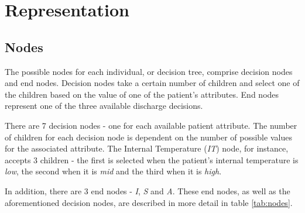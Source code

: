 \section{Representation}

\subsection{Nodes}
The possible nodes for each individual, or decision tree, comprise decision nodes and end nodes. Decision nodes take a certain number of children and select one of the children based on the value of one of the patient's attributes. End nodes represent one of the three available discharge decisions.

There are 7 decision nodes - one for each available patient attribute. The number of children for each decision node is dependent on the number of possible values for the associated attribute. The Internal Temperature (\emph{IT}) node, for instance, accepts 3 children - the first is selected when the patient's internal temperature is \emph{low}, the second when it is \emph{mid} and the third when it is \emph{high}.

In addition, there are 3 end nodes - \emph{I}, \emph{S} and \emph{A}. These end nodes, as well as the aforementioned decision nodes, are described in more detail in table \ref{tab:nodes}.

